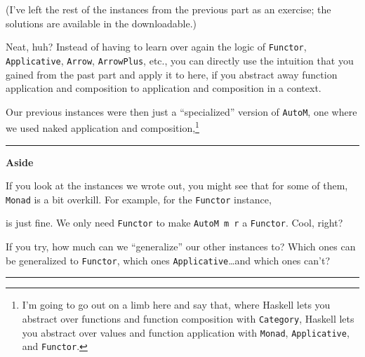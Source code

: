 \documentclass[]{article}
\newenvironment{Shaded}{}{}
\newcommand{\DataTypeTok}[1]{\textcolor[rgb]{0.56,0.13,0.00}{#1}}
\newcommand{\FunctionTok}[1]{\textcolor[rgb]{0.02,0.16,0.49}{#1}}
\newcommand{\KeywordTok}[1]{\textcolor[rgb]{0.00,0.44,0.13}{\textbf{#1}}}
\newcommand{\NormalTok}[1]{#1}
\newcommand{\OperatorTok}[1]{\textcolor[rgb]{0.40,0.40,0.40}{#1}}
\newcommand{\OtherTok}[1]{\textcolor[rgb]{0.00,0.44,0.13}{#1}}
\begin{document}
(I've left the rest of the instances from the previous part as an exercise; the
solutions are available in the downloadable.)

Neat, huh? Instead of having to learn over again the logic of \texttt{Functor},
\texttt{Applicative}, \texttt{Arrow}, \texttt{ArrowPlus}, etc., you can directly
use the intuition that you gained from the past part and apply it to here, if
you abstract away function application and composition to application and
composition in a context.

Our previous instances were then just a ``specialized'' version of
\texttt{AutoM}, one where we used naked application and composition,\footnote{I'm
  going to go out on a limb here and say that, where Haskell lets you abstract
  over functions and function composition with \texttt{Category}, Haskell lets
  you abstract over values and function application with \texttt{Monad},
  \texttt{Applicative}, and \texttt{Functor}.}

\begin{center}\rule{0.5\linewidth}{0.5pt}\end{center}

\textbf{Aside}

If you look at the instances we wrote out, you might see that for some of them,
\texttt{Monad} is a bit overkill. For example, for the \texttt{Functor}
instance,

\begin{Shaded}
\end{Shaded}

is just fine. We only need \texttt{Functor} to make \texttt{AutoM\ m\ r} a
\texttt{Functor}. Cool, right?

If you try, how much can we ``generalize'' our other instances to? Which ones
can be generalized to \texttt{Functor}, which ones
\texttt{Applicative}\ldots and which ones can't?

\begin{center}\rule{0.5\linewidth}{0.5pt}\end{center}
\end{document}
